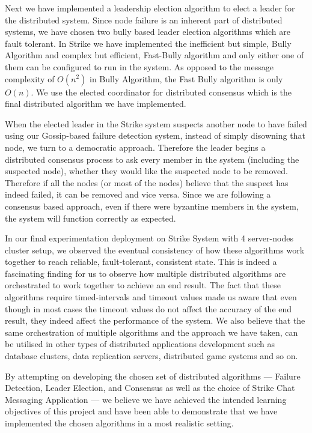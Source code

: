 \documentclass[dareport.tex]{subfiles}
\begin{document}
Next we have implemented a leadership election algorithm to elect a leader for the distributed system. Since node failure is an inherent part of distributed systems, we have chosen two bully based leader election algorithms which are fault tolerant. In Strike we have implemented the inefficient but simple, Bully Algorithm and complex but efficient, Fast-Bully algorithm and only either one of them can be configured to run in the system. As opposed to the message complexity of $ O(n^2) $ in Bully Algorithm, the Fast Bully algorithm is only $ O(n) $. We use the elected coordinator for distributed consensus which is the final distributed algorithm we have implemented.

When the elected leader in the Strike system suspects another node to have failed using our Gossip-based failure detection system, instead of simply disowning that node, we turn to a democratic approach. Therefore the leader begins a distributed consensus process to ask every member in the system (including the suspected node), whether they would like the suspected node to be removed. Therefore if all the nodes (or most of the nodes) believe that the suspect has indeed failed, it can be removed and vice versa. Since we are following a consensus based approach, even if there were byzantine members in the system, the system will function correctly as expected.

In our final experimentation deployment on Strike System with 4 server-nodes cluster setup, we observed the eventual consistency of how these algorithms work together to reach reliable, fault-tolerant, consistent state. This is indeed a fascinating finding for us to observe how multiple distributed algorithms are orchestrated to work together to achieve an end result. The fact that these algorithms require timed-intervals and timeout values made us aware that even though in most cases the timeout values do not affect the accuracy of the end result, they indeed affect the performance of the system. We also believe that the same orchestration of multiple algorithms and the approach we have taken, can be utilised in other types of distributed applications development such as database clusters, data replication servers, distributed game systems and so on.

By attempting on developing the chosen set of distributed algorithms --- Failure Detection, Leader Election, and Consensus as well as the choice of Strike Chat Messaging Application --- we believe we have achieved the intended learning objectives of this project and have been able to demonstrate that we have implemented the chosen algorithms in a most realistic setting.
\end{document}
